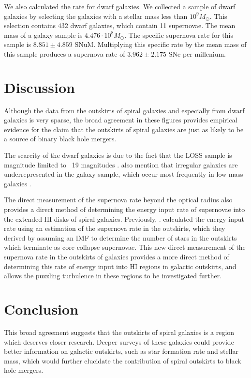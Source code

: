\documentclass[apj]{emulateapj}
\begin{document}
We also calculated the rate for dwarf galaxies. We collected a sample of dwarf galaxies by selecting the galaxies with a stellar mass less than $10^9 M_{\odot}$. This selection contains 432 dwarf galaxies, which contain 11 supernovae. The mean mass of a galaxy sample is $4.476 \cdot 10^{8} M_{\odot}$. The specific supernova rate for this sample is $8.851 \pm 4.859$ SNuM. Multiplying this specific rate by the mean mass of this sample produces a supernova rate of $3.962 \pm 2.175$ SNe per millenium.

\section{Discussion}

Although the data from the outskirts of spiral galaxies and especially from dwarf galaxies is very sparse, the broad agreement in these figures provides empirical evidence for the claim that the outskirts of spiral galaxies are just as likely to be a source of binary black hole mergers.

The scarcity of the dwarf galaxies is due to the fact that the LOSS sample is magnitude limited to ~19 magnitudes \citep{Leaman11}. \citet{Leaman11} also mention that irregular galaxies are underrepresented in the galaxy sample, which occur most frequently in low mass galaxies \citep{Kelvin14}.

The direct measurement of the supernova rate beyond the optical radius also provides a direct method of determining the energy input rate of supernovae into the extended HI disks of spiral galaxies. Previously, \citet{Tamburro09}. calculated the energy input rate using an estimation of the supernova rate in the outskirts, which they derived by assuming an IMF to determine the number of stars in the outskirts which terminate as core-collapse supernovae. This new direct measurement of the supernova rate in the outskirts of galaxies provides a more direct method of determining this rate of energy input into HI regions in galactic outskirts, and allows the puzzling turbulence in these regions to be investigated further.

\section{Conclusion}

This broad agreement suggests that the outskirts of spiral galaxies is a region which deserves closer research. Deeper surveys of these galaxies could provide better information on galactic outskirts, such as star formation rate and stellar mass, which would further elucidate the contribution of spiral outskirts to black hole mergers. 
\end{document}
